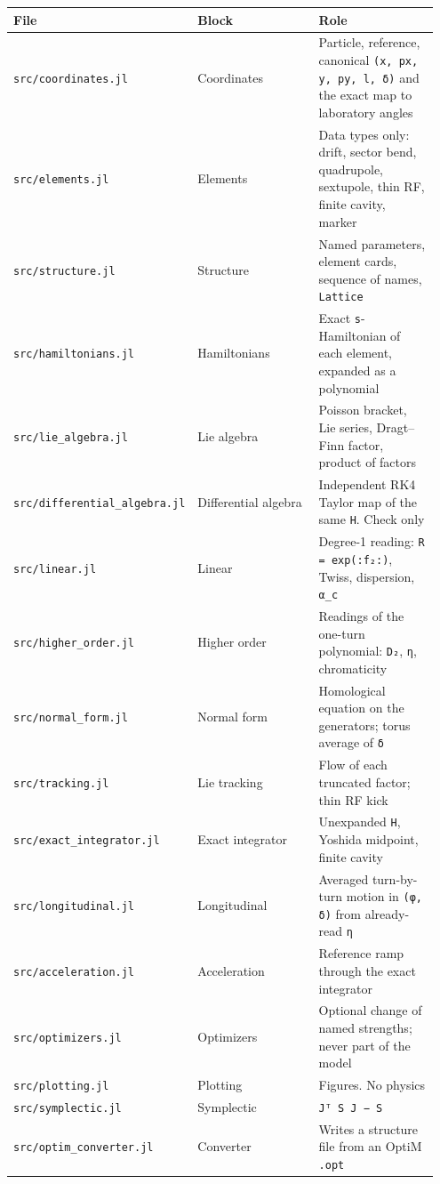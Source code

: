 \documentclass[11pt,a4paper]{article}
\begin{document}
\begin{center}\small\begin{tabular}{p{0.317\linewidth}p{0.317\linewidth}p{0.317\linewidth}}\hline
\textbf{File} & \textbf{Block} & \textbf{Role}\\\hline
\texttt{src/coordinates.jl} & Coordinates & Particle, reference, canonical \texttt{(x, px, y, py, l, δ)} and the exact map to laboratory angles\\
\texttt{src/elements.jl} & Elements & Data types only: drift, sector bend, quadrupole, sextupole, thin RF, finite cavity, marker\\
\texttt{src/structure.jl} & Structure & Named parameters, element cards, sequence of names, \texttt{Lattice}\\
\texttt{src/hamiltonians.jl} & Hamiltonians & Exact \texttt{s}-Hamiltonian of each element, expanded as a polynomial\\
\texttt{src/lie\_algebra.jl} & Lie algebra & Poisson bracket, Lie series, Dragt–Finn factor, product of factors\\
\texttt{src/differential\_algebra.jl} & Differential algebra & Independent RK4 Taylor map of the same \texttt{H}. Check only\\
\texttt{src/linear.jl} & Linear & Degree-1 reading: \texttt{R = exp(:f₂:)}, Twiss, dispersion, \texttt{α\_c}\\
\texttt{src/higher\_order.jl} & Higher order & Readings of the one-turn polynomial: \texttt{D₂}, \texttt{η}, chromaticity\\
\texttt{src/normal\_form.jl} & Normal form & Homological equation on the generators; torus average of \texttt{δ}\\
\texttt{src/tracking.jl} & Lie tracking & Flow of each truncated factor; thin RF kick\\
\texttt{src/exact\_integrator.jl} & Exact integrator & Unexpanded \texttt{H}, Yoshida midpoint, finite cavity\\
\texttt{src/longitudinal.jl} & Longitudinal & Averaged turn-by-turn motion in \texttt{(φ, δ)} from already-read \texttt{η}\\
\texttt{src/acceleration.jl} & Acceleration & Reference ramp through the exact integrator\\
\texttt{src/optimizers.jl} & Optimizers & Optional change of named strengths; never part of the model\\
\texttt{src/plotting.jl} & Plotting & Figures. No physics\\
\texttt{src/symplectic.jl} & Symplectic & \texttt{Jᵀ S J − S}\\
\texttt{src/optim\_converter.jl} & Converter & Writes a structure file from an OptiM \texttt{.opt}\\
\hline\end{tabular}\end{center}
\end{document}
